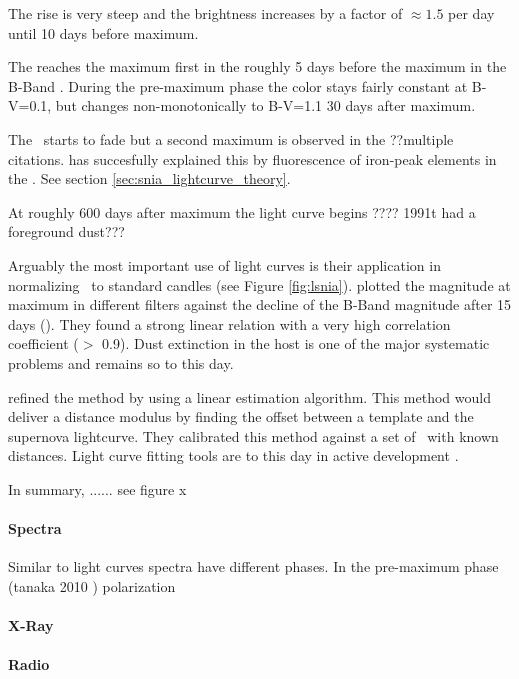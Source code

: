 The rise is very steep and the brightness increases by a factor of $\approx 1.5$ per day until 10 days before maximum. 

The \snia reaches the maximum first in the \nir roughly 5 days before the maximum in the B-Band \citep{2000MNRAS.314..782M}. 
During the pre-maximum phase the color stays fairly constant at B-V=0.1, but changes non-monotonically to B-V=1.1 30 days after maximum. 

The \snia\ starts to fade but  a second maximum is observed in the \nir \citep{2008ApJ...689..377W} ??multiple citations.  \citep{2006ApJ...649..939K} has succesfully explained this by fluorescence of iron-peak elements in the \nir. See section \ref{sec:snia_lightcurve_theory}.

At roughly 600 days after maximum the light curve begins ???? 1991t had a foreground dust??? 


Arguably the most important use of light curves is their application in normalizing \sneia\ to standard candles (see Figure \ref{fig:lsnia}). \citet[][]{1993ApJ...413L.105P} plotted the magnitude at maximum in different filters against the decline of the B-Band magnitude after 15 days (\dmb).  They found a strong linear relation with a very high correlation coefficient ($>$ 0.9). Dust extinction in the host is one of the major systematic problems and remains so to this day. 

\cite{1995ApJ...438L..17R} refined the method by using a linear estimation algorithm. This method would deliver a distance modulus by finding the offset between a template and the supernova lightcurve. They calibrated this method against a set of \sneia\ with known distances. 
Light curve fitting tools are to this day in active development \cite[e.g.][]{2007ApJ...659..122J, 2007A&A...466...11G}.

In summary, ...... see figure x



\paragraph{Spectra} Similar to light curves spectra have different phases. In the pre-maximum phase (tanaka 2010 )
polarization
\paragraph{X-Ray}

\paragraph{Radio}










